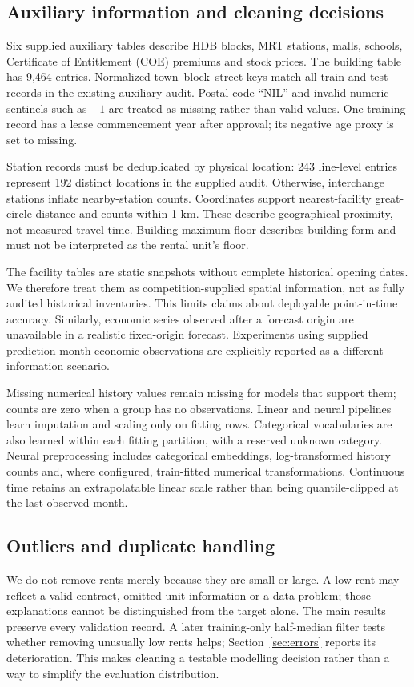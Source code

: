 \documentclass[conference]{IEEEtran}
\begin{document}
\subsection{Auxiliary information and cleaning decisions}
Six supplied auxiliary tables describe HDB blocks, MRT stations, malls, schools, Certificate of Entitlement (COE) premiums and stock prices. The building table has 9,464 entries. Normalized town--block--street keys match all train and test records in the existing auxiliary audit. Postal code ``NIL'' and invalid numeric sentinels such as $-1$ are treated as missing rather than valid values. One training record has a lease commencement year after approval; its negative age proxy is set to missing.

Station records must be deduplicated by physical location: 243 line-level entries represent 192 distinct locations in the supplied audit. Otherwise, interchange stations inflate nearby-station counts. Coordinates support nearest-facility great-circle distance and counts within 1 km. These describe geographical proximity, not measured travel time. Building maximum floor describes building form and must not be interpreted as the rental unit's floor.

The facility tables are static snapshots without complete historical opening dates. We therefore treat them as competition-supplied spatial information, not as fully audited historical inventories. This limits claims about deployable point-in-time accuracy. Similarly, economic series observed after a forecast origin are unavailable in a realistic fixed-origin forecast. Experiments using supplied prediction-month economic observations are explicitly reported as a different information scenario.

Missing numerical history values remain missing for models that support them; counts are zero when a group has no observations. Linear and neural pipelines learn imputation and scaling only on fitting rows. Categorical vocabularies are also learned within each fitting partition, with a reserved unknown category. Neural preprocessing includes categorical embeddings, log-transformed history counts and, where configured, train-fitted numerical transformations. Continuous time retains an extrapolatable linear scale rather than being quantile-clipped at the last observed month.

\subsection{Outliers and duplicate handling}
We do not remove rents merely because they are small or large. A low rent may reflect a valid contract, omitted unit information or a data problem; those explanations cannot be distinguished from the target alone. The main results preserve every validation record. A later training-only half-median filter tests whether removing unusually low rents helps; Section~\ref{sec:errors} reports its deterioration. This makes cleaning a testable modelling decision rather than a way to simplify the evaluation distribution.
\end{document}
